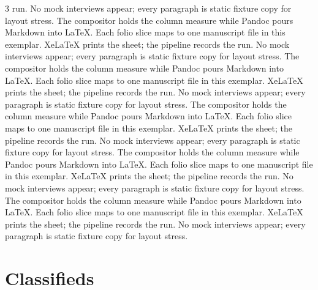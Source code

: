 \documentclass[
]{article}
\begin{document}
\begin{multicols}{3}
run. No mock interviews appear; every paragraph is static fixture copy
for layout stress. The compositor holds the column measure while Pandoc
pours Markdown into LaTeX. Each folio slice maps to one manuscript file
in this exemplar. XeLaTeX prints the sheet; the pipeline records the
run. No mock interviews appear; every paragraph is static fixture copy
for layout stress. The compositor holds the column measure while Pandoc
pours Markdown into LaTeX. Each folio slice maps to one manuscript file
in this exemplar. XeLaTeX prints the sheet; the pipeline records the
run. No mock interviews appear; every paragraph is static fixture copy
for layout stress. The compositor holds the column measure while Pandoc
pours Markdown into LaTeX. Each folio slice maps to one manuscript file
in this exemplar. XeLaTeX prints the sheet; the pipeline records the
run. No mock interviews appear; every paragraph is static fixture copy
for layout stress. The compositor holds the column measure while Pandoc
pours Markdown into LaTeX. Each folio slice maps to one manuscript file
in this exemplar. XeLaTeX prints the sheet; the pipeline records the
run. No mock interviews appear; every paragraph is static fixture copy
for layout stress. The compositor holds the column measure while Pandoc
pours Markdown into LaTeX. Each folio slice maps to one manuscript file
in this exemplar. XeLaTeX prints the sheet; the pipeline records the
run. No mock interviews appear; every paragraph is static fixture copy
for layout stress.

\end{multicols}

\newpage

\section{Classifieds}\label{classifieds}
\end{document}
